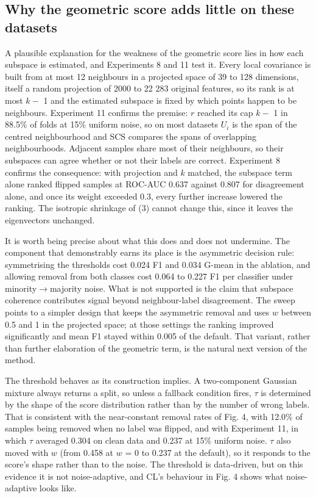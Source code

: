 \documentclass[conference]{IEEEtran}
\begin{document}
\subsection{Why the geometric score adds little on these datasets}\label{sec:why-the-geometric-score-adds-little-on-these-datasets}

A plausible explanation for the weakness of the geometric score lies in how each subspace is estimated, and Experiments 8 and 11 test it. Every local covariance is built from at most 12 neighbours in a projected space of 39 to 128 dimensions, itself a random projection of 2000 to 22 283 original features, so its rank is at most $k -$ 1 and the estimated subspace is fixed by which points happen to be neighbours. Experiment 11 confirms the premise: $r$ reached its cap $k -$ 1 in 88.5\% of folds at 15\% uniform noise, so on most datasets $U_{i}$ is the span of the centred neighbourhood and SCS compares the spans of overlapping neighbourhoods. Adjacent samples share most of their neighbours, so their subspaces can agree whether or not their labels are correct. Experiment 8 confirms the consequence: with projection and $k$ matched, the subspace term alone ranked flipped samples at ROC-AUC 0.637 against 0.807 for disagreement alone, and once its weight exceeded 0.3, every further increase lowered the ranking. The isotropic shrinkage of (3) cannot change this, since it leaves the eigenvectors unchanged.

It is worth being precise about what this does and does not undermine. The component that demonstrably earns its place is the asymmetric decision rule: symmetrising the thresholds cost 0.024 F1 and 0.034 G-mean in the ablation, and allowing removal from both classes cost 0.064 to 0.227 F1 per classifier under minority$\rightarrow $majority noise. What is not supported is the claim that subspace coherence contributes signal beyond neighbour-label disagreement. The sweep points to a simpler design that keeps the asymmetric removal and uses $w$ between 0.5 and 1 in the projected space; at those settings the ranking improved significantly and mean F1 stayed within 0.005 of the default. That variant, rather than further elaboration of the geometric term, is the natural next version of the method.

The threshold behaves as its construction implies. A two-component Gaussian mixture always returns a split, so unless a fallback condition fires, $\tau $ is determined by the shape of the score distribution rather than by the number of wrong labels. That is consistent with the near-constant removal rates of Fig. 4, with 12.0\% of samples being removed when no label was flipped, and with Experiment 11, in which $\tau $ averaged 0.304 on clean data and 0.237 at 15\% uniform noise. $\tau $ also moved with $w$ (from 0.458 at $w$ = 0 to 0.237 at the default), so it responds to the score's shape rather than to the noise. The threshold is data-driven, but on this evidence it is not noise-adaptive, and CL's behaviour in Fig. 4 shows what noise-adaptive looks like.
\end{document}
